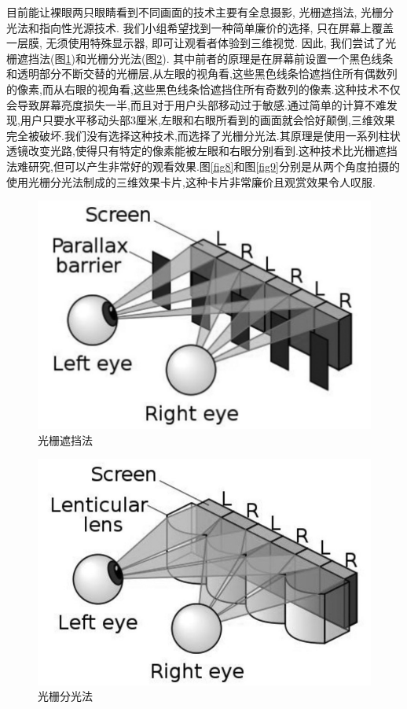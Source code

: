 \documentclass[a4paper, 11pt]{article}
\begin{document}
\begin{CJK}{UTF8}{gbsn}
目前能让裸眼两只眼睛看到不同画面的技术主要有全息摄影, 光栅遮挡法, 光栅分光法和指向性光源技术. 我们小组希望找到一种简单廉价的选择, 只在屏幕上覆盖一层膜, 无须使用特殊显示器, 即可让观看者体验到三维视觉. 因此, 我们尝试了光栅遮挡法(图\ref{fig6})和光栅分光法(图\ref{fig7}). 其中前者的原理是在屏幕前设置一个黑色线条和透明部分不断交替的光栅层,从左眼的视角看,这些黑色线条恰遮挡住所有偶数列的像素,而从右眼的视角看,这些黑色线条恰遮挡住所有奇数列的像素.这种技术不仅会导致屏幕亮度损失一半,而且对于用户头部移动过于敏感.通过简单的计算不难发现,用户只要水平移动头部3厘米,左眼和右眼所看到的画面就会恰好颠倒,三维效果完全被破坏.我们没有选择这种技术,而选择了光栅分光法.其原理是使用一系列柱状透镜改变光路,使得只有特定的像素能被左眼和右眼分别看到.这种技术比光栅遮挡法难研究,但可以产生非常好的观看效果.图\ref{fig8}和图\ref{fig9}分别是从两个角度拍摄的使用光栅分光法制成的三维效果卡片,这种卡片非常廉价且观赏效果令人叹服.
\begin{figure}[h!]
  \centerline{\includegraphics[width=\linewidth]{6.png}}
  \caption{光栅遮挡法}
  \label{fig6}
\end{figure}
\begin{figure}[h!]
  \centerline{\includegraphics[width=\linewidth]{7.png}}
  \caption{光栅分光法}
  \label{fig7}
\end{figure}


\end{CJK}
\end{document}
